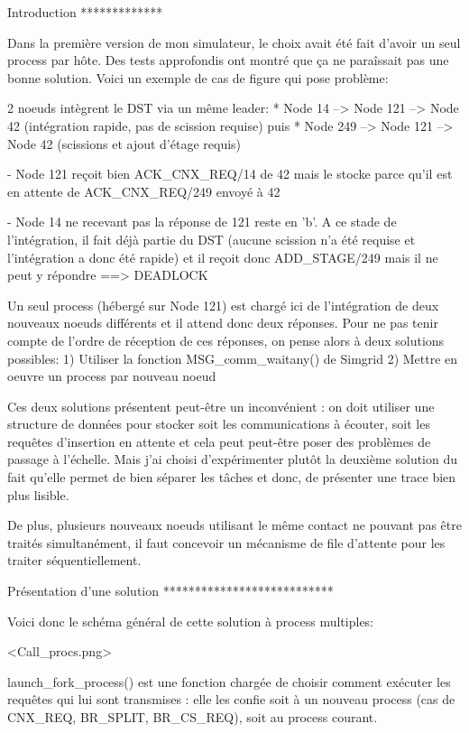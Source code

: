 Introduction
*************

Dans la première version de mon simulateur, le choix avait été fait d'avoir un seul process par hôte. Des tests
approfondis ont montré que ça ne paraîssait pas une bonne solution. Voici un exemple de cas de figure qui pose problème:

2 noeuds intègrent le DST via un même leader:
 * Node 14 --> Node 121 --> Node 42 (intégration rapide, pas de scission requise)
   puis
 * Node 249 --> Node 121 --> Node 42 (scissions et ajout d'étage requis)

 - Node 121 reçoit bien ACK_CNX_REQ/14 de 42 mais le stocke parce qu'il est en attente de ACK_CNX_REQ/249 envoyé à 42

 - Node 14 ne recevant pas la réponse de 121 reste en 'b'. A ce stade de l'intégration, il fait déjà partie du DST
   (aucune scission n'a été requise et l'intégration a donc été rapide) et il reçoit donc ADD_STAGE/249 mais il ne peut
   y répondre ==> DEADLOCK

Un seul process (hébergé sur Node 121) est chargé ici de l'intégration de deux nouveaux noeuds différents et il attend
donc deux réponses. Pour ne pas tenir compte de l'ordre de réception de ces réponses, on pense alors à deux solutions
possibles:
1) Utiliser la fonction MSG_comm_waitany() de Simgrid
2) Mettre en oeuvre un process par nouveau noeud

Ces deux solutions présentent peut-être un inconvénient : on doit utiliser une structure de données pour stocker soit
les communications à écouter, soit les requêtes d'insertion en attente et cela peut peut-être poser des problèmes de
passage à l'échelle. Mais j'ai choisi d'expérimenter plutôt la deuxième solution du fait qu'elle permet de bien séparer
les tâches et donc, de présenter une trace bien plus lisible.

De plus, plusieurs nouveaux noeuds utilisant le même contact ne pouvant pas être traités simultanément, il faut
concevoir un mécanisme de file d'attente pour les traiter séquentiellement.

Présentation d'une solution
***************************

Voici donc le schéma général de cette solution à process multiples:

<Call_procs.png>

launch_fork_process() est une fonction chargée de choisir comment exécuter les requêtes qui lui sont transmises : elle
les confie soit à un nouveau process (cas de CNX_REQ, BR_SPLIT, BR_CS_REQ), soit au process courant.

